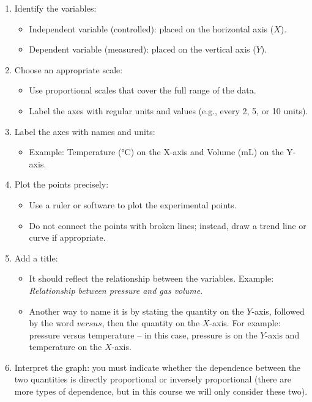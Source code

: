 \begin{enumerate}[label=\numberballmDarkTeal]
        \item  Identify the variables:
        \begin{itemize}
            \item Independent variable (controlled): placed on the horizontal axis (\( X \)).
            \item Dependent variable (measured): placed on the vertical axis (\( Y \)).
        \end{itemize}
        \item Choose an appropriate scale:
        \begin{itemize}
            \item Use proportional scales that cover the full range of the data.
            \item Label the axes with regular units and values (e.g., every 2, 5, or 10 units).
        \end{itemize}
        \item Label the axes with names and units:
        \begin{itemize}
            \item Example: Temperature (°C) on the X-axis and Volume (mL) on the Y-axis.
        \end{itemize}
        \item Plot the points precisely:
        \begin{itemize}
            \item Use a ruler or software to plot the experimental points.
            \item Do not connect the points with broken lines; instead, draw a trend line or curve if appropriate.
        \end{itemize}
        \item  Add a title:
        \begin{itemize}
            \item It should reflect the relationship between the variables.
            Example: \textit{Relationship between pressure and gas volume}.
            \item Another way to name it is by stating the quantity on the \( Y \)-axis, followed by the word \( versus \), then the quantity on the \( X \)-axis.
            For example: pressure versus temperature – in this case, pressure is on the \( Y \)-axis and temperature on the \( X \)-axis.
        \end{itemize}
        \item Interpret the graph: you must indicate whether the dependence between the two quantities is directly proportional or inversely proportional (there are more types of dependence, but in this course we will only consider these two).

\end{enumerate}
